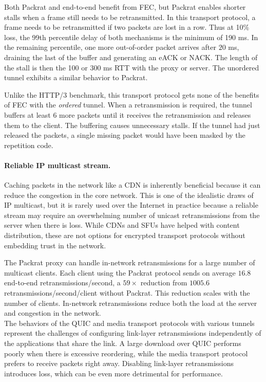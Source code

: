 Both Packrat and end-to-end benefit from FEC, but Packrat enables shorter stalls when
a frame still needs to be retransmitted. In this transport protocol, a frame
needs to be retransmitted if two packets are lost in a row. Thus at 10\% loss,
the 99th percentile delay of both mechanisms is the minimum of 190 ms. In the
remaining percentile, one more out-of-order packet arrives after $20$ ms,
draining the last of the buffer and generating an eACK or NACK. The length of
the stall is then the 100 or 300 ms RTT with the proxy or server. The unordered
tunnel exhibits a similar behavior to Packrat.

Unlike the HTTP/3 benchmark, this transport protocol gets none of the benefits
of FEC with the \textit{ordered} tunnel. When a retransmission is required, the
tunnel buffers at least 6 more packets until it receives the retransmission and
releases them to the client. The buffering causes unnecessary stalls. If the
tunnel had just released the packets, a single missing packet would have been
masked by the repetition code.

\paragraph{Reliable IP multicast stream.}

Caching packets in the network like a CDN is inherently beneficial because it
can reduce the congestion in the core network. This is one of the idealistic
draws of IP multicast, but it is rarely used over the Internet in practice
because a reliable stream may require an overwhelming number of unicast
retransmissions from the server when there is loss. While CDNs and SFUs have
helped with content distribution, these are not options for encrypted transport
protocols without embedding trust in the network.

The Packrat proxy can handle in-network retransmissions for a large number of
multicast clients. Each client using the Packrat protocol sends on average $16.8$
end-to-end retransmissions/second, a $59\!\times$ reduction from $1005.6$
retransmissions/second/client without Packrat. This reduction scales with the
number of clients. In-network retransmissions reduce both the load at the
server and congestion in the network.\\

\noindent
The behaviors of the QUIC and media transport protocols with various tunnels
represent the challenges of configuring link-layer retransmissions
independently of the applications that share the link. A large download
over QUIC performs poorly
when there is excessive reordering, while the media transport protocol prefers
to receive packets right away.
Disabling link-layer retransmissions introduces loss, which can be even more
detrimental for performance.

